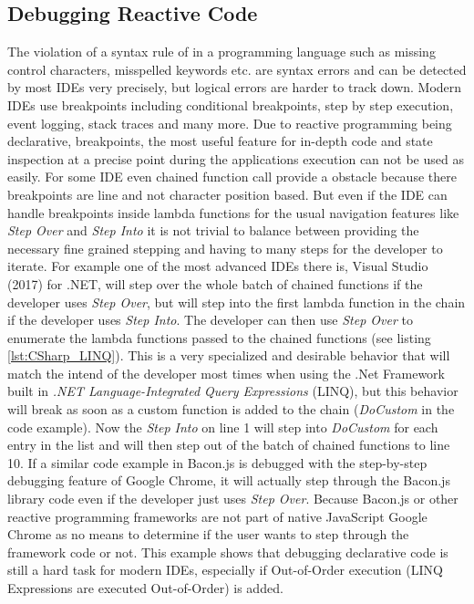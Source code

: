 \subsection{Debugging Reactive Code}
The violation of a syntax rule of in a programming language such as missing control characters, misspelled keywords etc. are syntax errors and can be detected by most IDEs very precisely, but logical errors are harder to track down. Modern IDEs use breakpoints including conditional breakpoints, step by step execution, event logging, stack traces and many more. Due to reactive programming being declarative, breakpoints, the most useful feature for in-depth code and state inspection at a precise point during the applications execution can not be used as easily. For some IDE even chained function call provide a obstacle because there breakpoints are line and not character position based. But even if the IDE can handle breakpoints inside lambda functions for the usual navigation features like \emph{Step Over} and \emph{Step Into} it is not trivial to balance between providing the necessary fine grained stepping and having to many steps for the developer to iterate. For example one of the most advanced IDEs there is, Visual Studio (2017) for .NET, will step over the whole batch of chained functions if the developer uses \emph{Step Over}, but will step into the first lambda function in the chain if the developer uses \emph{Step Into}. The developer can then use \emph{Step Over} to enumerate the lambda functions passed to the chained functions (see listing \ref{lst:CSharp_LINQ}). This is a very specialized and desirable behavior that will match the intend of the developer most times when using the .Net Framework built in \emph{.NET Language-Integrated Query Expressions} (LINQ), but this behavior will break as soon as a custom function is added to the chain (\emph{DoCustom} in the code example). Now the \emph{Step Into} on line 1 will step into \emph{DoCustom} for each entry in the list and will then step out of the batch of chained functions to line 10. If a similar code example in Bacon.js is debugged with the step-by-step debugging feature of Google Chrome, it will actually step through the Bacon.js library code even if the developer just uses \emph{Step Over}. Because Bacon.js or other reactive programming frameworks are not part of native JavaScript Google Chrome as no means to determine if the user wants to step through the framework code or not.
This example shows that debugging declarative code is still a hard task for modern IDEs, especially if Out-of-Order execution (LINQ Expressions are executed Out-of-Order) is added.
